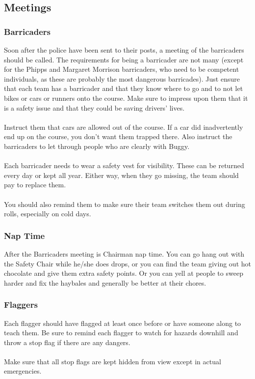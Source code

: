 \subsection{Meetings}
\subsubsection{Barricaders}
Soon after the police have been sent to their posts, a meeting of the
barricaders should be called. The requirements for being a barricader are not
many (except for the Phipps and Margaret Morrison barricaders, who need to be
competent individuals, as these are probably the most dangerous barricades).
Just ensure that each team has a barricader and that they know where to go
and to not let bikes or cars or runners onto the course. Make sure to impress
upon them that it is a safety issue and that they could be saving drivers'
lives.
\\\\
Instruct them that cars are allowed out of the course. If a car did
inadvertently end up on the course, you don't want them trapped there. Also
instruct the barricaders to let through people who are clearly with Buggy.
\\\\
Each barricader needs to wear a safety vest for visibility. These can be
returned every day or kept all year. Either way, when they go missing,
the team should pay to replace them.
\\\\
You should also remind them to make sure their team switches them out
during rolls, especially on cold days.

\subsubsection{Nap Time}
After the Barricaders meeting is Chairman nap time. You can go hang out
with the Safety Chair while he/she does drops, or you can find the team
giving out hot chocolate and give them extra safety points. Or you can yell
at people to sweep harder and fix the haybales and generally be better at
their chores.

\subsubsection{Flaggers}
Each flagger should have flagged at least once before or have someone along
to teach them. Be sure to remind each flagger to watch for hazards downhill
and throw a stop flag if there are any dangers.
\\\\
Make sure that all stop flags are kept hidden from view except in actual
emergencies.

